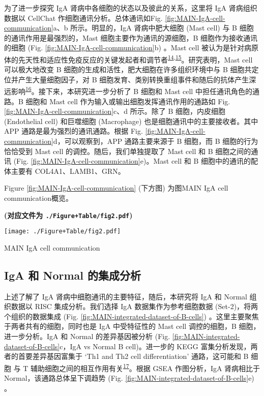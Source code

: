 \documentclass[
]{article}
\begin{document}
为了进一步探究 IgA 肾病中各细胞的状态以及彼此的关系，这里将 IgA 肾病组织数据以 CellChat 作细胞通讯分析。总体通讯如Fig. \ref{fig:MAIN-IgA-cell-communication}a、b 所示。明显的，IgA 肾病中肥大细胞 (Mast cell) 与 B 细胞的通讯作用是最强烈的，Mast 细胞主要作为通讯的源细胞，B 细胞作为接收通讯的细胞 (Fig. \ref{fig:MAIN-IgA-cell-communication}b) 。Mast cell 被认为是针对病原体的先天性和适应性免疫反应的关键发起者和调节者\textsuperscript{\protect\hyperlink{ref-MastCellsAsSMukai2018}{14},\protect\hyperlink{ref-MastCellRespoMarsha2004}{15}}。研究表明，Mast cell 可以极大地改变 B 细胞的生成和活性，肥大细胞在许多组织环境中与 B 细胞共定位并产生大量细胞因子，对 B 细胞发育、类别转换重组事件和随后的抗体产生深远影响\textsuperscript{\protect\hyperlink{ref-MastCellModulPalma2021}{16}}。接下来，本研究进一步分析了 B 细胞和 Mast cell 中担任通讯角色的通路。B 细胞和 Mast cell 作为输入或输出细胞发挥通讯作用的通路如 Fig. \ref{fig:MAIN-IgA-cell-communication}c、d 所示。除了 B 细胞，内皮细胞 (Endothelial cell) 和巨噬细胞 (Macrophage) 也是细胞通讯中的主要接收者。其中 APP 通路是最为强烈的通讯通路。根据 Fig. \ref{fig:MAIN-IgA-cell-communication}d，可以观察到，APP 通路主要来源于 B 细胞，而 B 细胞的行为恰恰受到 Mast cell 的调控。随后，我们单独提取了 Mast cell 和 B 细胞之间的通讯 (Fig. \ref{fig:MAIN-IgA-cell-communication}e)。Mast cell 和 B 细胞中的通讯的配体主要有 COL4A1、LAMB1、GRN。

Figure \ref{fig:MAIN-IgA-cell-communication} (下方图) 为图MAIN IgA cell communication概览。

\textbf{(对应文件为 \texttt{./Figure+Table/fig2.pdf})}

\def\@captype{figure}
\begin{center}
\texttt{[image: ./Figure+Table/fig2.pdf]}
\caption{MAIN IgA cell communication}\label{fig:MAIN-IgA-cell-communication}
\end{center}

\hypertarget{bpath}{%
\subsection{IgA 和 Normal 的集成分析}\label{bpath}}

上述了解了 IgA 肾病中细胞通讯的主要特征，随后，本研究将 IgA 和 Normal 组织数据以 RISC 集成分析。我们选择 IgA 数据集作为参考细胞数据 (Set-2)，将两个组织的数据集成 (Fig. \ref{fig:MAIN-integrated-dataset-of-B-cells}) 。这里主要聚焦于两者共有的细胞，同时也是 IgA 中受特征性的 Mast cell 调控的细胞，B 细胞，进一步分析。IgA 和 Normal 的差异基因被分析 (Fig. \ref{fig:MAIN-integrated-dataset-of-B-cells}c，IgA vs Normal B cell)。进一步的 KEGG 富集分析发现，两者的首要差异基因富集于 `Th1 and Th2 cell differentiation' 通路，这可能和 B 细胞 与 T 辅助细胞之间的相互作用有关\textsuperscript{\protect\hyperlink{ref-IncreasedPropoDuWa2022}{17}}。根据 GSEA 作图分析，IgA 肾病相比于 Normal，该通路总体呈下调趋势 (Fig. \ref{fig:MAIN-integrated-dataset-of-B-cells}e) 。
\end{document}
